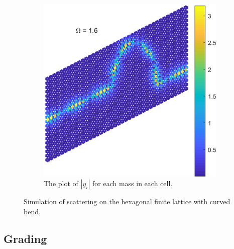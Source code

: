 \begin{figure}
\begin{subfigure}[b]{.5\textwidth}
  \includegraphics[width=1\linewidth]{imgs/curvedbendscat.png}
  \caption{The plot of $|y_i|$ for each mass in each cell.}
  \label{fig:sub2}
\end{subfigure}
\caption{Simulation of scattering on the hexagonal finite lattice with curved
  bend.}
\label{fig:curvedbend}
\end{figure}

\subsection{Grading}
